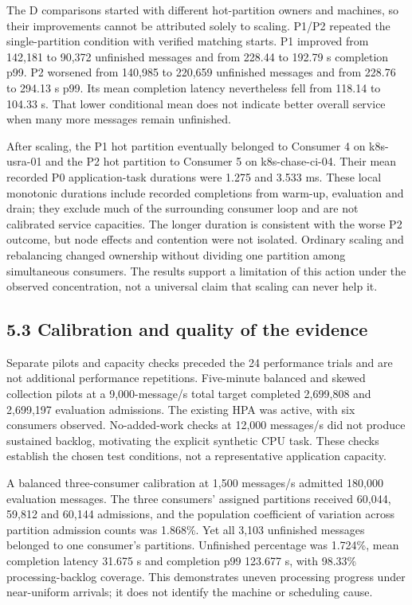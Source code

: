 The D comparisons started with different hot-partition owners and machines, so their improvements cannot be attributed solely to scaling. P1/P2 repeated the single-partition condition with verified matching starts. P1 improved from 142,181 to 90,372 unfinished messages and from 228.44 to 192.79 s completion p99. P2 worsened from 140,985 to 220,659 unfinished messages and from 228.76 to 294.13 s p99. Its mean completion latency nevertheless fell from 118.14 to 104.33 s. That lower conditional mean does not indicate better overall service when many more messages remain unfinished.

After scaling, the P1 hot partition eventually belonged to Consumer 4 on k8s-usra-01 and the P2 hot partition to Consumer 5 on k8s-chase-ci-04. Their mean recorded P0 application-task durations were 1.275 and 3.533 ms. These local monotonic durations include recorded completions from warm-up, evaluation and drain; they exclude much of the surrounding consumer loop and are not calibrated service capacities. The longer duration is consistent with the worse P2 outcome, but node effects and contention were not isolated. Ordinary scaling and rebalancing changed ownership without dividing one partition among simultaneous consumers. The results support a limitation of this action under the observed concentration, not a universal claim that scaling can never help it.

\subsection*{5.3 Calibration and quality of the evidence}

Separate pilots and capacity checks preceded the 24 performance trials and are not additional performance repetitions. Five-minute balanced and skewed collection pilots at a 9,000-message/s total target completed 2,699,808 and 2,699,197 evaluation admissions. The existing HPA was active, with six consumers observed. No-added-work checks at 12,000 messages/s did not produce sustained backlog, motivating the explicit synthetic CPU task. These checks establish the chosen test conditions, not a representative application capacity.

A balanced three-consumer calibration at 1,500 messages/s admitted 180,000 evaluation messages. The three consumers' assigned partitions received 60,044, 59,812 and 60,144 admissions, and the population coefficient of variation across partition admission counts was 1.868\%. Yet all 3,103 unfinished messages belonged to one consumer's partitions. Unfinished percentage was 1.724\%, mean completion latency 31.675 s and completion p99 123.677 s, with 98.33\% processing-backlog coverage. This demonstrates uneven processing progress under near-uniform arrivals; it does not identify the machine or scheduling cause.

